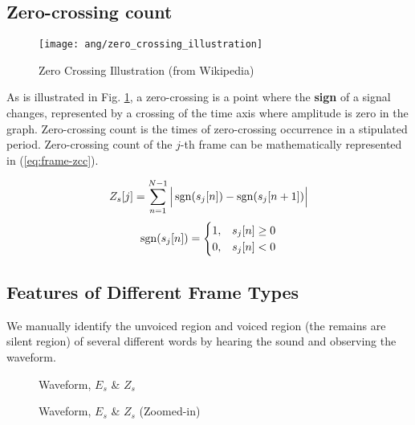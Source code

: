 \subsection{Zero-crossing count}

\begin{figure}[H]
\centering
\texttt{[image: ang/zero\_crossing\_illustration]}
\caption{Zero Crossing Illustration (from Wikipedia)}
\label{zero_crossing_illustration}
\end{figure}

As is illustrated in Fig. \ref{zero_crossing_illustration}, a zero-crossing is a point where the \textbf{sign} of a signal changes, represented by a crossing of the time axis where amplitude is zero in the graph. Zero-crossing count is the times of zero-crossing occurrence in a stipulated period. Zero-crossing count of the $j$-th frame can be mathematically represented in (\ref{eq:frame-zcc}).

\begin{equation}
\label{eq:frame-zcc}
Z_s[j] = \sum_{n=1}^{N-1} \Big| \operatorname{sgn}(s_j[n]) - \operatorname{sgn}(s_j[n+1]) \Big|
\end{equation}
\begin{equation}
\operatorname{sgn}(s_j[n]) =
\begin{cases}
1, &s_j[n] \ge 0\\
0, &s_j[n] < 0
\end{cases}
\end{equation}


\subsection{Features of Different Frame Types}

We manually identify the unvoiced region and voiced region (the remains are silent region) of several different words by hearing the sound and observing the waveform.

\begin{figure}[H]
\begin{minipage}[t]{0.5\linewidth}
\centering
{}
\caption{Waveform, $E_s$ \& $Z_s$}
\label{threshold_example1}
\end{minipage}
\begin{minipage}[t]{0.5\linewidth}
\centering
{}
\caption{Waveform, $E_s$ \& $Z_s$ (Zoomed-in)}
\label{threshold_example2}
\end{minipage}
\end{figure}

